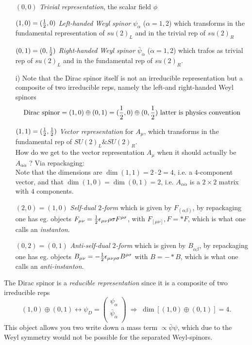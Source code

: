 \begin{enumerate}
\item[$(0,0)$] \emph{Trivial representation}, the scalar field $\phi$
\item[$(1,0)=(\frac{1}{2},0)$] \emph{Left-handed Weyl spinor} $\psi_\alpha$ ($\alpha=1,2$) which transforms in the fundamental representation of $su(2)_L$ and in the trivial rep of $su(2)_R$
\item[$(0,1)=(0,\frac{1}{2})$] \emph{Right-handed Weyl spinor} $\bar{ \psi}_{\dot{\alpha}}$ ($\dot{\alpha}=1,2$) which trafos as trivial rep of $su(2)_L$ and in the fundamental rep of $su(2)_R$.
\item[i)] Note that the Dirac spinor itself is not an irreducible representation but a composite of two irreducible reps, namely the left-and right-handed Weyl spinors
\begin{equation*}
	\text{Dirac spinor} = (1,0) \oplus (0,1) = (\frac{1}{2},0) \oplus (0,\frac{1}{2}) \text{ latter is physics convention}
\end{equation*}
\item[$(1,1)=(\frac{1}{2},\frac{1}{2})$] \emph{Vector representation} for $A_\mu$, which transforms in the fundamental rep of $SU(2)_L\&SU(2)_R$.\\
How do we get to the vector representation $A_\mu$ when it should actually be $A_{\alpha \dot{\alpha}}$ ? Via repackaging:\\
Note that the dimensions are $\dim(1,1)=2\cdot 2=4$, i.e. a $4$-component vector, and that $\dim(1,0)=\dim(0,1)=2$, i.e. $A_{\alpha \dot{\alpha}}$ is a $2\times2$ matrix with $4$ components.
\item[$(2,0)=(1,0)$] \emph{Self-dual $2$-form} which is given by $F_{(\alpha \beta)}$, by repackaging one has eg. objects $F_{\mu \nu}= \frac{1}{2} \epsilon{_{\mu \nu}\rho \sigma} F^{\rho \sigma}$, with $F_[\mu \nu], F=*F$, which is what one calls an \emph{instanton}.
\item[$(0,2)=(0,1)$] \emph{Anti-self-dual $2$-form} which is given by $B_{\dot{\alpha}\dot{\beta}}$, by repackaging one has eg. objects $B_{\mu \nu}= - \frac{1}{2} \epsilon_{\mu \nu\rho \sigma} B^{\rho \sigma}$ with $B=-*B$, which is what one calls an \emph{anti-instanton}.
\end{enumerate}
The Dirac spinor is a \emph{reducible representation} since it is a composite of two irreducible reps
\begin{equation*}
(1,0) \oplus (0,1) \leftrightarrow 	\psi_D= \begin{pmatrix}
		\psi_\alpha\\
		\bar{ \psi}_{\dot{\alpha}}\\
	\end{pmatrix}\;\Rightarrow\; \dim\left[(1,0)\oplus (0,1) \right] = 4.
\end{equation*}
This object allows you two write down a mass term $\propto \bar{ \psi}\psi$, which due to the Weyl symmetry would not be possible for the separated Weyl-spinors.\\

